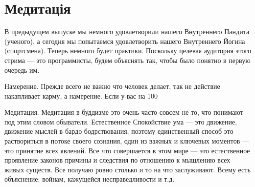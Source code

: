 \section{Медитація}

В предыдущем выпуске мы немного удовлетворили нашего Внутреннего Пандита (ученого), а сегодня мы попытаемся удовлетворить нашего Внутреннего Йогина (спортсмена). Теперь немного будет практики. Поскольку целевая аудитория этого стрима — это программисты, будем объяснять так, чтобы было понятно в первую очередь им.

Намерение. Прежде всего не важно что человек делает, так не действие накапливает карму, а намерение. Если у вас на 100%

Медитация. Медитация в буддизме это очень часто совсем не то, что понимают под этим словом обыватели. Естественное Спокойствие ума — это движение, движение мыслей в бардо бодрствования, поэтому единственный способ это раствориться в потоке своего сознания, один из важных и ключевых моментов — это принятие всех явлений. Все что совершается в этом мире — это естественное проявление законов причины и следствия по отношению к мышлению всех живых существ. Все получаю ровно столько и то на что заслуживают. Всему есть объяснение: войнам, кажущейся несправедливости и т.д.

